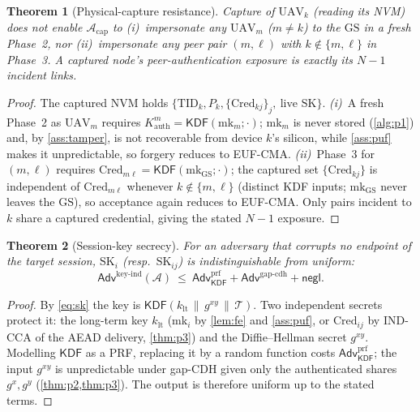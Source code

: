 \documentclass[11pt,a4paper]{article}
\theoremstyle{jrnlplain}
\newtheorem{theorem}{Theorem}
\theoremstyle{jrnldef}
\newcommand{\GS}{\mathrm{GS}}
\newcommand{\UAV}{\mathrm{UAV}}
\newcommand{\TID}{\mathrm{TID}}
\newcommand{\Cred}{\mathrm{Cred}}
\newcommand{\mk}{\mathrm{mk}}
\newcommand{\SK}{\mathrm{SK}}
\newcommand{\KDF}{\mathsf{KDF}}
\newcommand{\adv}{\mathcal{A}}
\newcommand{\negl}{\mathsf{negl}}
\newcommand{\Adv}{\mathsf{Adv}}
\newcommand{\catt}{\,\|\,}
\newcommand{\transcript}{\mathcal{T}}
\begin{document}
\begin{theorem}[Physical-capture resistance]\label{thm:capture}
Capture of $\UAV_k$ (reading its NVM) does not enable $\adv_{\mathrm{cap}}$ to
\textup{(i)}~impersonate any $\UAV_m$ ($m\ne k$) to the $\GS$ in a fresh
Phase~2, nor \textup{(ii)}~impersonate any peer pair $(m,\ell)$ with
$k\notin\{m,\ell\}$ in Phase~3. A captured node's peer-authentication exposure
is exactly its $N-1$ incident links.
\end{theorem}
\begin{proof}
The captured NVM holds $\{\TID_k,P_k,\{\Cred_{kj}\}_j,\ \text{live }\SK\}$.
\emph{(i)}~A fresh Phase~2 as $\UAV_m$ requires
$K^{m}_{\mathrm{auth}}=\KDF(\mk_m;\cdot)$; $\mk_m$ is never stored
(\cref{alg:p1}) and, by \cref{ass:tamper}, is not recoverable from device
$k$'s silicon, while \cref{ass:puf} makes it unpredictable, so forgery reduces
to EUF-CMA. \emph{(ii)}~Phase~3 for $(m,\ell)$ requires
$\Cred_{m\ell}=\KDF(\mk_{\GS};\cdot)$; the captured set $\{\Cred_{kj}\}$ is
independent of $\Cred_{m\ell}$ whenever $k\notin\{m,\ell\}$ (distinct KDF
inputs; $\mk_{\GS}$ never leaves the $\GS$), so acceptance again reduces to
EUF-CMA. Only pairs incident to $k$ share a captured credential, giving the
stated $N-1$ exposure.
\end{proof}

\begin{theorem}[Session-key secrecy]\label{thm:secrecy}
For an adversary that corrupts no endpoint of the target session, $\SK_i$
(resp.\ $\SK_{ij}$) is indistinguishable from uniform:
\begin{equation}
\Adv^{\mathrm{key\text{-}ind}}(\adv)\ \le\
\Adv^{\mathrm{prf}}_{\KDF}+\Adv^{\mathrm{gap\text{-}cdh}}+\negl.
\end{equation}
\end{theorem}
\begin{proof}
By \eqref{eq:sk} the key is $\KDF(k_{\mathrm{lt}}\catt g^{xy}\catt\transcript)$.
Two independent secrets protect it: the long-term key $k_{\mathrm{lt}}$
($\mk_i$ by \cref{lem:fe} and \cref{ass:puf}, or $\Cred_{ij}$ by IND-CCA of
the AEAD delivery, \cref{thm:p3}) and the Diffie--Hellman secret $g^{xy}$.
Modelling $\KDF$ as a PRF, replacing it by a random function costs
$\Adv^{\mathrm{prf}}_{\KDF}$; the input $g^{xy}$ is unpredictable under gap-CDH
given only the authenticated shares $g^{x},g^{y}$ (\cref{thm:p2,thm:p3}). The
output is therefore uniform up to the stated terms.
\end{proof}
\end{document}
